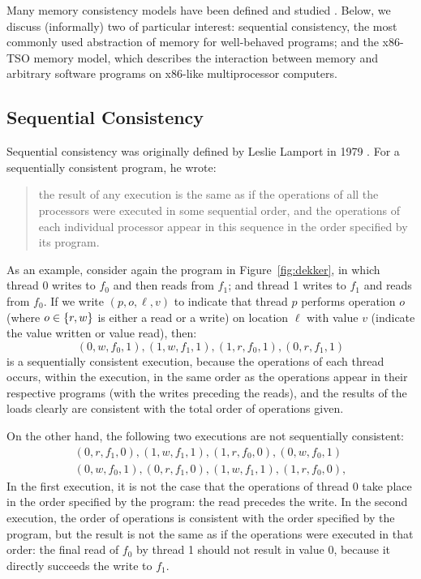 \documentclass[11pt]{report}
\begin{document}
Many memory consistency models have been defined and studied \cite{SteinkeNutt,higham98weak,DBLP:journals/computer/AdveG96}. Below, we discuss (informally) two of particular interest: sequential consistency, the most commonly used abstraction of memory for well-behaved programs; and the x86-TSO memory model, which describes the interaction between memory and arbitrary software programs on x86-like multiprocessor computers. 

\subsection{Sequential Consistency} 
\label{sec:sc}

Sequential consistency was originally defined by Leslie Lamport in 1979 \cite{DBLP:journals/tc/Lamport79}. For a sequentially consistent program, he wrote: \begin{quotation}\noindent the result of any execution is the same as if the operations of all the processors were executed in some sequential order, and the operations of each individual processor appear in this sequence in the order specified by its program. \end{quotation} 

As an example, consider again the program in Figure~\ref{fig:dekker}, in which thread 0 writes to $f_0$ and then reads from $f_1$; and thread 1 writes to $f_1$ and reads from $f_0$. If we write $(p,o,\ell,v)$ to indicate that thread $p$ performs operation $o$ (where $o \in \left\lbrace r,w \right\rbrace$ is either a read or a write) on location $\ell$ with value $v$ (indicate the value written or value read), then: \[ (0,w,f_0,1), (1,w,f_1,1), (1,r,f_0,1), (0,r,f_1,1)\] is a sequentially consistent execution, because the operations of each thread occurs, within the execution, in the same order as the operations appear in their respective programs (with the writes preceding the reads), and the results of the loads clearly are consistent with the total order of operations given. 

On the other hand, the following two executions are not sequentially consistent: \begin{align*}
  (0,r,f_1,0), (1,w,f_1,1), (1,r,f_0,0), (0,w,f_0,1) \\ 
  (0,w,f_0,1), (0,r,f_1,0), (1,w,f_1,1), (1,r,f_0,0), 
\end{align*} In the first execution, it is not the case that the operations of thread 0 take place in the order specified by the program: the read precedes the write. In the second execution, the order of operations is consistent with the order specified by the program, but the result is not the same as if the operations were executed in that order: the final read of $f_0$ by thread 1 should not result in value 0, because it directly succeeds the write to $f_1$. 
\end{document}
